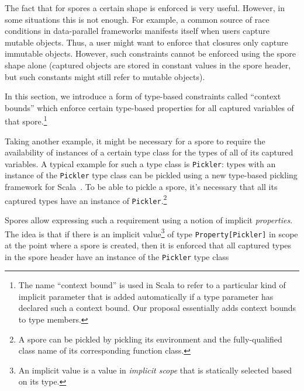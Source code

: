\documentclass[runningheads]{llncs}
\begin{document}
\begin{sloppypar}
The fact that for spores a certain shape is enforced is very useful. However,
in some situations this is not enough. For example, a common source of race
conditions in data-parallel frameworks manifests itself when users capture
mutable objects. Thus, a user might want to enforce that closures only capture
immutable objects. However, such constraints
cannot be enforced using the spore shape alone (captured objects are stored in
constant values in the spore header, but such constants might still refer to
mutable objects).

In this section, we introduce a form of type-based constraints called
``context bounds'' which enforce certain type-based properties for all
captured variables of that spore.\footnote{The name ``context bound'' is used
in Scala to refer to a particular kind of implicit parameter that is added
automatically if a type parameter has declared such a context bound. Our
proposal essentially adds context bounds to type members.}

Taking another example, it might be necessary for a spore to require the
availability of instances of a certain type class for the types of all of its
captured variables. A typical example for such a type class is \verb|Pickler|:
types with an instance of the \verb|Pickler| type class can be pickled using a
new type-based pickling framework for Scala~\cite{ScalaPickling}. To be able
to pickle a spore, it's necessary that all its captured types have an instance
of \verb|Pickler|.\footnote{A spore can be pickled by pickling its environment and
the fully-qualified class name of its corresponding function class.}


Spores allow expressing such a requirement using a notion of implicit {\em
properties}. The idea is that if there is an implicit value\footnote{An implicit value is a value in \textit{implicit scope} that is statically selected based on its type.}
of type \verb|Property[Pickler]| in scope at the
point where a spore is created, then it is enforced that all captured types in
the spore header have an instance of the \verb|Pickler| type class


\end{sloppypar}
\end{document}
